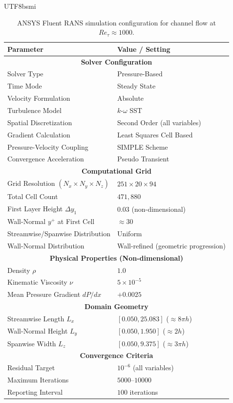\documentclass[master]{NTHUthesis}
\begin{document}
\begin{CJK*}{UTF8}{bsmi}
\begin{table}[htbp]
    \centering
    \caption{ANSYS Fluent RANS simulation configuration for channel flow at $Re_\tau \approx 1000$.}
    \label{tab:fluent_rans_setup}
    \begin{tabular}{ll}
    \toprule
    \textbf{Parameter} & \textbf{Value / Setting} \\
    \midrule
    \multicolumn{2}{c}{\textbf{Solver Configuration}} \\
    Solver Type & Pressure-Based \\
    Time Mode & Steady State \\
    Velocity Formulation & Absolute \\
    Turbulence Model & $k$-$\omega$ SST \\
    Spatial Discretization & Second Order (all variables) \\
    Gradient Calculation & Least Squares Cell Based \\
    Pressure-Velocity Coupling & SIMPLE Scheme \\
    Convergence Acceleration & Pseudo Transient \\
    \midrule
    \multicolumn{2}{c}{\textbf{Computational Grid}} \\
    Grid Resolution $(N_x \times N_y \times N_z)$ & $251 \times 20 \times 94$ \\
    Total Cell Count & $471,880$ \\
    First Layer Height $\Delta y_1$ & $0.03$ (non-dimensional) \\
    Wall-Normal $y^+$ at First Cell & $\approx 30$ \\
    Streamwise/Spanwise Distribution & Uniform \\
    Wall-Normal Distribution & Wall-refined (geometric progression) \\
    \midrule
    \multicolumn{2}{c}{\textbf{Physical Properties (Non-dimensional)}} \\
    Density $\rho$ & $1.0$ \\
    Kinematic Viscosity $\nu$ & $5 \times 10^{-5}$ \\
    Mean Pressure Gradient $dP/dx$ & $+0.0025$ \\
    \midrule
    \multicolumn{2}{c}{\textbf{Domain Geometry}} \\
    Streamwise Length $L_x$ & $[0.050, 25.083]$ ($\approx 8\pi h$) \\
    Wall-Normal Height $L_y$ & $[0.050, 1.950]$ ($\approx 2h$) \\
    Spanwise Width $L_z$ & $[0.050, 9.375]$ ($\approx 3\pi h$) \\
    \midrule
    \multicolumn{2}{c}{\textbf{Convergence Criteria}} \\
    Residual Target & $10^{-6}$ (all variables) \\
    Maximum Iterations & $5000$--$10000$ \\
    Reporting Interval & $100$ iterations \\
    \bottomrule
    \end{tabular}
\end{table}


\end{CJK*}
\end{document}
